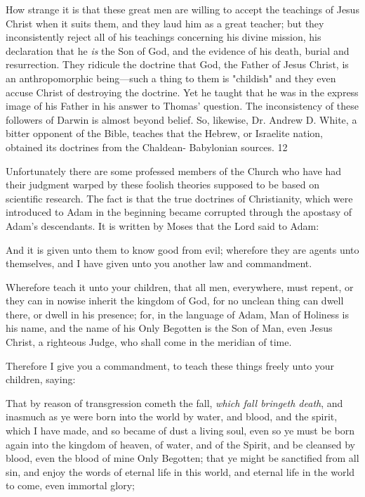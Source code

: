 How strange it is that these great men are willing to accept the teachings of Jesus Christ
when it suits them, and they laud him as a great teacher; but they inconsistently reject all of
his teachings concerning his divine mission, his declaration that he \textit{is} the Son of God, and the
evidence of his death, burial and resurrection. They ridicule the doctrine that God, the Father
of Jesus Christ, is an anthropomorphic being—such a thing to them is "childish" and they
even accuse Christ of destroying the doctrine. Yet he taught that he was in the express image
of his Father in his answer to Thomas' question. The inconsistency of these followers of
Darwin is almost beyond belief. So, likewise, Dr. Andrew D. White, a bitter opponent of the
Bible, teaches that the Hebrew, or Israelite nation, obtained its doctrines from the Chaldean-
Babylonian sources. 12

Unfortunately there are some professed members of the Church who have had their judgment
warped by these foolish theories supposed to be based on scientific research. The fact is that
the true doctrines of Christianity, which were introduced to Adam in the beginning became
corrupted through the apostasy of Adam's descendants. It is written by Moses that the Lord
said to Adam:

And it is given unto them to know good from evil; wherefore they are agents unto
themselves, and I have given unto you another law and commandment.

Wherefore teach it unto your children, that all men, everywhere, must repent, or they can in
nowise inherit the kingdom of God, for no unclean thing can dwell there, or dwell in his
presence; for, in the language of Adam, Man of Holiness is his name, and the name of his
Only Begotten is the Son of Man, even Jesus Christ, a righteous Judge, who shall come in the
meridian of time.

Therefore I give you a commandment, to teach these things freely unto your children, saying:

That by reason of transgression cometh the fall, \textit{which fall bringeth death}, and inasmuch as
ye were born into the world by water, and blood, and the spirit, which I have made, and so
became of dust a living soul, even so ye must be born again into the kingdom of heaven, of
water, and of the Spirit, and be cleansed by blood, even the blood of mine Only Begotten;
that ye might be sanctified from all sin, and enjoy the words of eternal life in this world, and
eternal life in the world to come, even immortal glory;

